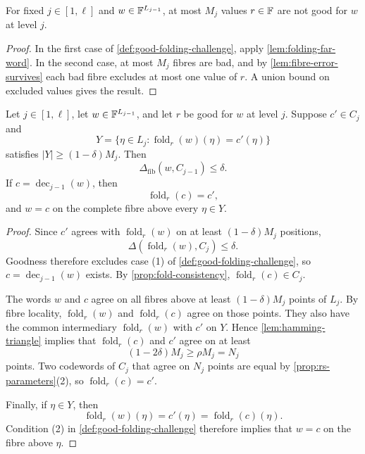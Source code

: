 \begin{lemma}
\label{lem:few-bad-folding-challenges}
For fixed $j\in[1,\ell]$ and $w\in\mathbb{F}^{L_{j-1}}$, at most $M_j$ values $r\in\mathbb{F}$ are not good for $w$ at level $j$.
\end{lemma}

\begin{proof}
In the first case of \cref{def:good-folding-challenge}, apply \cref{lem:folding-far-word}.  In the second case, at most $M_j$ fibres are bad, and by \cref{lem:fibre-error-survives} each bad fibre excludes at most one value of $r$.  A union bound on excluded values gives the result.
\end{proof}

\begin{lemma}
\label{lem:one-sound-folding-step}
Let $j\in[1,\ell]$, let $w\in\mathbb{F}^{L_{j-1}}$, and let $r$ be good for $w$ at level $j$.  Suppose $c'\in C_j$ and
\[
  Y=\{\eta\in L_j:\operatorname{fold}_r(w)(\eta)=c'(\eta)\}
\]
satisfies $|Y|\ge(1-\delta)M_j$.  Then
\[
  \Delta_{\mathrm{fib}}(w,C_{j-1})\le\delta.
\]
If $c=\operatorname{dec}_{j-1}(w)$, then
\[
  \operatorname{fold}_r(c)=c',
\]
and $w=c$ on the complete fibre above every $\eta\in Y$.
\end{lemma}

\begin{proof}
Since $c'$ agrees with $\operatorname{fold}_r(w)$ on at least $(1-\delta)M_j$ positions,
\[
  \Delta(\operatorname{fold}_r(w),C_j)\le\delta.
\]
Goodness therefore excludes case (1) of \cref{def:good-folding-challenge}, so $c=\operatorname{dec}_{j-1}(w)$ exists.  By \cref{prop:fold-consistency}, $\operatorname{fold}_r(c)\in C_j$.

The words $w$ and $c$ agree on all fibres above at least $(1-\delta)M_j$ points of $L_j$.  By fibre locality, $\operatorname{fold}_r(w)$ and $\operatorname{fold}_r(c)$ agree on those points.  They also have the common intermediary $\operatorname{fold}_r(w)$ with $c'$ on $Y$.  Hence \cref{lem:hamming-triangle} implies that $\operatorname{fold}_r(c)$ and $c'$ agree on at least
\[
  (1-2\delta)M_j
  \ge
  \rho M_j
  =N_j
\]
points.  Two codewords of $C_j$ that agree on $N_j$ points are equal by \cref{prop:rs-parameters}(2), so $\operatorname{fold}_r(c)=c'$.

Finally, if $\eta\in Y$, then
\[
  \operatorname{fold}_r(w)(\eta)
  =c'(\eta)
  =\operatorname{fold}_r(c)(\eta).
\]
Condition (2) in \cref{def:good-folding-challenge} therefore implies that $w=c$ on the fibre above $\eta$.
\end{proof}

